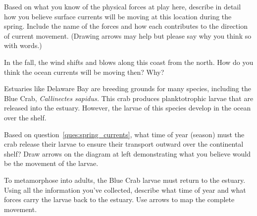 \documentclass[12pt, addpoints]{exam}
\begin{document}
\begin{questions}

\question[5]
\label{ques:spring_currents}Based on what you know of the physical forces at play here, describe in detail how you believe surface currents will be moving at this location during the spring. Include the name of the forces and how each contributes to the direction of current movement. (Drawing arrows may help but please say why you think so with words.)


\newpage

\question[5]
In the fall, the wind shifts and blows along this coast from the north.  How do you think the ocean currents will be moving then? Why?




\begin{multicols}{2}


\columnbreak

Estuaries like Delaware Bay are breeding grounds for many species, including the Blue Crab, \textit{Callinectes sapidus.} This crab produces planktotrophic larvae that are released into the estuary. However, the larvae of this species develop in the ocean over the shelf.

\question[3]
Based on question~\ref{ques:spring_currents}, what time of year (season) must the crab release their larvae to ensure their transport outward over the continental shelf? Draw arrows on the diagram at left demonstrating what you believe would be the movement of the larvae.

\end{multicols}


\question[5]
To metamorphose into adults, the Blue Crab larvae must return to the estuary.  Using all the information you’ve collected, describe what time of year and what forces carry the larvae back to the estuary. Use arrows to map the complete movement.


\end{questions}
\end{document}
